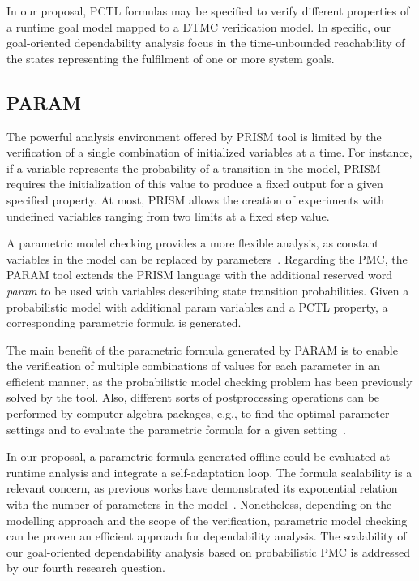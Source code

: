 In our proposal, PCTL formulas may be specified to verify different properties of a runtime goal model mapped to a DTMC verification model. In specific, our goal-oriented dependability analysis focus in the time-unbounded reachability of the states representing the fulfilment of one or more system goals.

\subsection{PARAM}

The powerful analysis environment offered by PRISM tool is limited by the verification of a single combination of initialized variables at a time. For instance, if a variable represents the probability of a transition in the model, PRISM requires the initialization of this value to produce a fixed output for a given specified property. At most, PRISM allows the creation of experiments with undefined variables ranging from two limits at a fixed step value. 

A parametric model checking provides a more flexible analysis, as constant variables in the model can be replaced by parameters~\cite{Hahn:2010}. Regarding the PMC, the PARAM tool extends the PRISM language with the additional reserved word \textit{param} to be used with variables describing state transition probabilities. Given a probabilistic model with additional param variables and a PCTL property, a corresponding parametric formula is generated.

The main benefit of the parametric formula generated by PARAM is to enable the verification of multiple combinations of values for each parameter in an efficient manner, as the probabilistic model checking problem has been previously solved by the tool. Also, different sorts of postprocessing operations can be performed by computer algebra packages, e.g., to find the optimal parameter settings and to evaluate the parametric formula for a given setting~\cite{Hahn:2010}.

In our proposal, a parametric formula generated offline could be evaluated at runtime analysis and integrate a self-adaptation loop. The formula scalability is a relevant concern, as previous works have demonstrated its exponential relation with the number of parameters in the model~\cite{VINICIUS}. Nonetheless, depending on the modelling approach and the scope of the verification, parametric model checking can be proven an efficient approach for dependability analysis. The scalability of our goal-oriented dependability analysis based on probabilistic PMC is addressed by our fourth research question.

